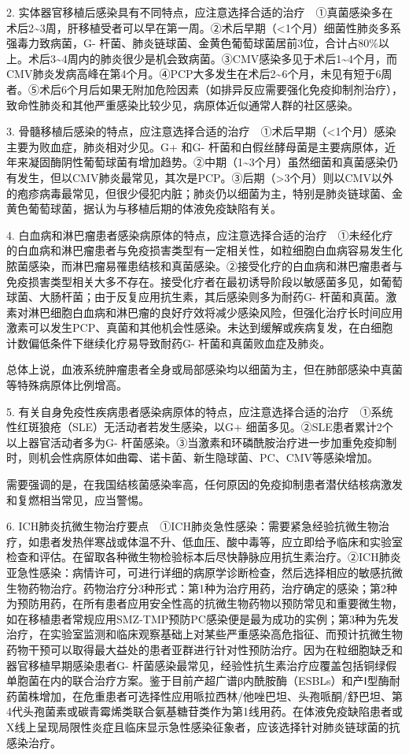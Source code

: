 2.
实体器官移植后感染具有不同特点，应注意选择合适的治疗　①真菌感染多在术后2\textasciitilde{}3周，肝移植受者可以早在第一周。②术后早期（\textless{}1个月）细菌性肺炎多系强毒力致病菌，G{-}
杆菌、肺炎链球菌、金黄色葡萄球菌居前3位，合计占80\%以上。术后3\textasciitilde{}4周内的肺炎很少是机会致病菌。③CMV感染多见于术后1\textasciitilde{}4个月，而CMV肺炎发病高峰在第4个月。④PCP大多发生在术后2\textasciitilde{}6个月，未见有短于6周者。⑤术后6个月后如果无附加危险因素（如排异反应需要强化免疫抑制剂治疗），致命性肺炎和其他严重感染比较少见，病原体近似通常人群的社区感染。

3.
骨髓移植后感染的特点，应注意选择合适的治疗　①术后早期（\textless{}1个月）感染主要为败血症，肺炎相对少见。G{+}
和G{-}
杆菌和白假丝酵母菌是主要病原体，近年来凝固酶阴性葡萄球菌有增加趋势。②中期（1\textasciitilde{}3个月）虽然细菌和真菌感染仍有发生，但以CMV肺炎最常见，其次是PCP。③后期（\textgreater{}3个月）则以CMV以外的疱疹病毒最常见，但很少侵犯内脏；肺炎仍以细菌为主，特别是肺炎链球菌、金黄色葡萄球菌，据认为与移植后期的体液免疫缺陷有关。

4.
白血病和淋巴瘤患者感染病原体的特点，应注意选择合适的治疗　①未经化疗的白血病和淋巴瘤患者与免疫损害类型有一定相关性，如粒细胞白血病容易发生化脓菌感染，而淋巴瘤易罹患结核和真菌感染。②接受化疗的白血病和淋巴瘤患者与免疫损害类型相关大多不存在。接受化疗者在最初诱导阶段以敏感菌多见，如葡萄球菌、大肠杆菌；由于反复应用抗生素，其后感染则多为耐药G{-}
杆菌和真菌。激素对淋巴细胞白血病和淋巴瘤的良好疗效将减少感染风险，但强化治疗长时间应用激素可以发生PCP、真菌和其他机会性感染。未达到缓解或疾病复发，在白细胞计数偏低条件下继续化疗易导致耐药G{-}
杆菌和真菌败血症及肺炎。

总体上说，血液系统肿瘤患者全身或局部感染均以细菌为主，但在肺部感染中真菌等特殊病原体比例增高。

5.
有关自身免疫性疾病患者感染病原体的特点，应注意选择合适的治疗　①系统性红斑狼疮（SLE）无活动者若发生感染，以G{+}
细菌多见。②SLE患者累计2个以上器官活动者多为G{-}
杆菌感染。③当激素和环磷酰胺治疗进一步加重免疫抑制时，则机会性病原体如曲霉、诺卡菌、新生隐球菌、PC、CMV等感染增加。

需要强调的是，在我国结核菌感染率高，任何原因的免疫抑制患者潜伏结核病激发和复燃相当常见，应当警惕。

6.
ICH肺炎抗微生物治疗要点　①ICH肺炎急性感染：需要紧急经验抗微生物治疗，如患者发热伴寒战或体温不升、低血压、酸中毒等，应立即给予临床和实验室检查和评估。在留取各种微生物检验标本后尽快静脉应用抗生素治疗。②ICH肺炎亚急性感染：病情许可，可进行详细的病原学诊断检查，然后选择相应的敏感抗微生物药物治疗。药物治疗分3种形式：第1种为治疗用药，治疗确定的感染；第2种为预防用药，在所有患者应用安全性高的抗微生物药物以预防常见和重要微生物，如在移植患者常规应用SMZ-TMP预防PC感染便是最为成功的实例；第3种为先发治疗，在实验室监测和临床观察基础上对某些严重感染高危指征、而预计抗微生物药物干预可以取得最大益处的患者亚群进行针对性预防治疗。因为在粒细胞缺乏和器官移植早期感染患者G{-}
杆菌感染最常见，经验性抗生素治疗应覆盖包括铜绿假单胞菌在内的联合治疗方案。鉴于目前产超广谱β内酰胺酶（ESBLs）和产Ⅰ型酶耐药菌株增加，在危重患者可选择性应用哌拉西林/他唑巴坦、头孢哌酮/舒巴坦、第4代头孢菌素或碳青霉烯类联合氨基糖苷类作为第1线用药。在体液免疫缺陷患者或X线上呈现局限性炎症且临床显示急性感染征象者，应该选择针对肺炎链球菌的抗感染治疗。

